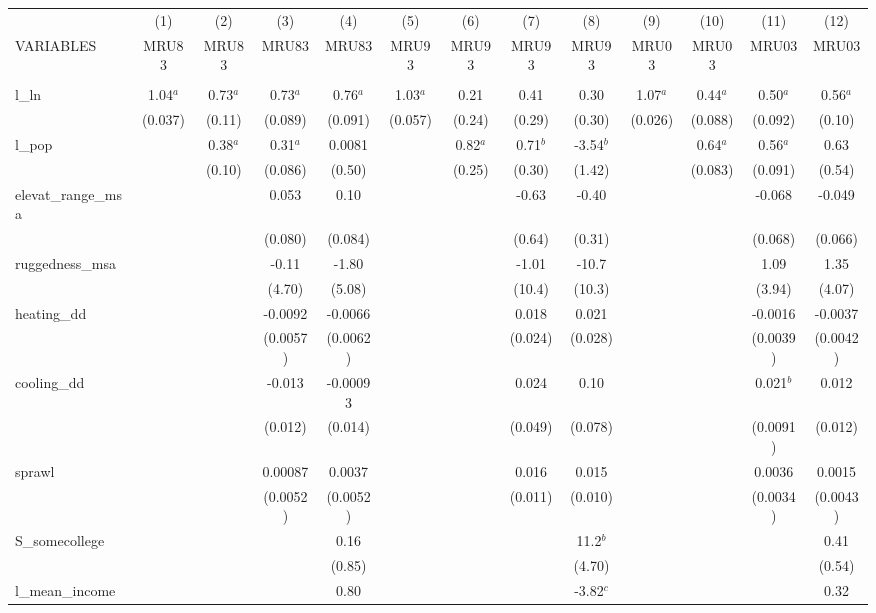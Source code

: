 \documentclass[]{article}
\begin{document}
\begin{tabular}{lcccccccccccc} \hline
 & (1) & (2) & (3) & (4) & (5) & (6) & (7) & (8) & (9) & (10) & (11) & (12) \\
VARIABLES & MRU83 & MRU83 & MRU83 & MRU83 & MRU93 & MRU93 & MRU93 & MRU93 & MRU03 & MRU03 & MRU03 & MRU03 \\ \hline
 &  &  &  &  &  &  &  &  &  &  &  &  \\
l\_ln & 1.04$^a$ & 0.73$^a$ & 0.73$^a$ & 0.76$^a$ & 1.03$^a$ & 0.21 & 0.41 & 0.30 & 1.07$^a$ & 0.44$^a$ & 0.50$^a$ & 0.56$^a$ \\
 & (0.037) & (0.11) & (0.089) & (0.091) & (0.057) & (0.24) & (0.29) & (0.30) & (0.026) & (0.088) & (0.092) & (0.10) \\
l\_pop &  & 0.38$^a$ & 0.31$^a$ & 0.0081 &  & 0.82$^a$ & 0.71$^b$ & -3.54$^b$ &  & 0.64$^a$ & 0.56$^a$ & 0.63 \\
 &  & (0.10) & (0.086) & (0.50) &  & (0.25) & (0.30) & (1.42) &  & (0.083) & (0.091) & (0.54) \\
elevat\_range\_msa &  &  & 0.053 & 0.10 &  &  & -0.63 & -0.40 &  &  & -0.068 & -0.049 \\
 &  &  & (0.080) & (0.084) &  &  & (0.64) & (0.31) &  &  & (0.068) & (0.066) \\
ruggedness\_msa &  &  & -0.11 & -1.80 &  &  & -1.01 & -10.7 &  &  & 1.09 & 1.35 \\
 &  &  & (4.70) & (5.08) &  &  & (10.4) & (10.3) &  &  & (3.94) & (4.07) \\
heating\_dd &  &  & -0.0092 & -0.0066 &  &  & 0.018 & 0.021 &  &  & -0.0016 & -0.0037 \\
 &  &  & (0.0057) & (0.0062) &  &  & (0.024) & (0.028) &  &  & (0.0039) & (0.0042) \\
cooling\_dd &  &  & -0.013 & -0.00093 &  &  & 0.024 & 0.10 &  &  & 0.021$^b$ & 0.012 \\
 &  &  & (0.012) & (0.014) &  &  & (0.049) & (0.078) &  &  & (0.0091) & (0.012) \\
sprawl &  &  & 0.00087 & 0.0037 &  &  & 0.016 & 0.015 &  &  & 0.0036 & 0.0015 \\
 &  &  & (0.0052) & (0.0052) &  &  & (0.011) & (0.010) &  &  & (0.0034) & (0.0043) \\
S\_somecollege &  &  &  & 0.16 &  &  &  & 11.2$^b$ &  &  &  & 0.41 \\
 &  &  &  & (0.85) &  &  &  & (4.70) &  &  &  & (0.54) \\
l\_mean\_income &  &  &  & 0.80 &  &  &  & -3.82$^c$ &  &  &  & 0.32 \\

\end{tabular}
\end{document}
